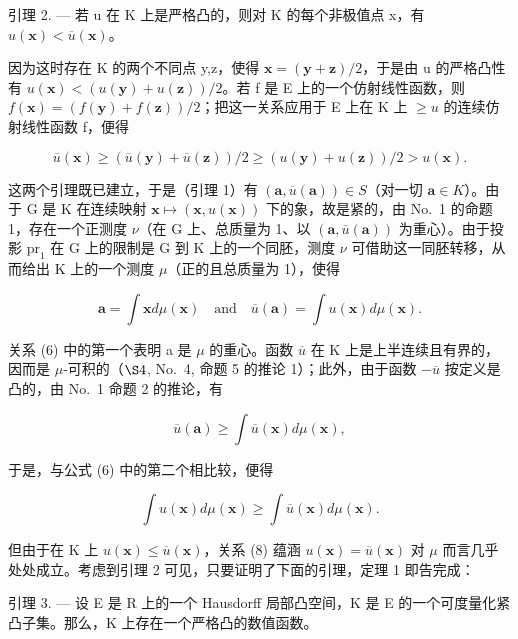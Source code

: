 引理 2. --- 若 u 在 K 上是严格凸的，则对 K 的每个非极值点 x，有 \(u(\mathbf{x}) < \overline{u}(\mathbf{x})\)。

因为这时存在 K 的两个不同点 y,z，使得 \(\mathbf{x} = (\mathbf{y} + \mathbf{z})/2\)，于是由 u 的严格凸性有 \(u(\mathbf{x}) < (u(\mathbf{y}) + u(\mathbf{z}))/2\)。若 f 是 E 上的一个仿射线性函数，则 \(f(\mathbf{x}) = (f(\mathbf{y}) + f(\mathbf{z}))/2\)；把这一关系应用于 E 上在 K 上 \(\geqslant u\) 的连续仿射线性函数 f，便得

\[
\overline {{{u}}} (\mathbf {x}) \geqslant \left(\overline {{{u}}} (\mathbf {y}) + \overline {{{u}}} (\mathbf {z})\right) / 2 \geqslant \left(u (\mathbf {y}) + u (\mathbf {z})\right) / 2 > u (\mathbf {x}).
\]

这两个引理既已建立，于是（引理 1）有 \((\mathbf{a},\overline{u} (\mathbf{a}))\in S\)（对一切 \(\mathbf{a}\in K\)）。由于 G 是 K 在连续映射 \(\mathbf{x}\mapsto (\mathbf{x},u(\mathbf{x}))\) 下的象，故是紧的，由 No.~1 的命题 1，存在一个正测度 \(\nu\)（在 G 上、总质量为 1、以 \((\mathbf{a},\overline{u} (\mathbf{a}))\) 为重心）。由于投影 \(\mathrm{pr}_1\) 在 G 上的限制是 G 到 K 上的一个同胚，测度 \(\nu\) 可借助这一同胚转移，从而给出 K 上的一个测度 \(\mu\)（正的且总质量为 1），使得

\[
\mathbf {a} = \int \mathbf {x} d \mu (\mathbf {x}) \quad \mathrm{and} \quad \overline {{{u}}} (\mathbf {a}) = \int u (\mathbf {x}) d \mu (\mathbf {x}).\tag{6}
\]

关系 (6) 中的第一个表明 a 是 \(\mu\) 的重心。函数 \(\overline{u}\) 在 K 上是上半连续且有界的，因而是 \(\mu\)-可积的（\(\S4\), No.~4, 命题 5 的推论 1）；此外，由于函数 \(-\overline{u}\) 按定义是凸的，由 No.~1 命题 2 的推论，有

\[
\overline {{{u}}} (\mathbf {a}) \geqslant \int \overline {{{u}}} (\mathbf {x}) d \mu (\mathbf {x}),\tag{7}
\]

于是，与公式 (6) 中的第二个相比较，便得

\[
\int u (\mathbf {x}) d \mu (\mathbf {x}) \geqslant \int \overline {{{u}}} (\mathbf {x}) d \mu (\mathbf {x}).\tag{8}
\]

但由于在 K 上 \(u(\mathbf{x}) \leqslant \overline{u}(\mathbf{x})\)，关系 (8) 蕴涵 \(u(\mathbf{x}) = \overline{u}(\mathbf{x})\) 对 \(\mu\) 而言几乎处处成立。考虑到引理 2 可见，只要证明了下面的引理，定理 1 即告完成：

引理 3. --- 设 E 是 R 上的一个 Hausdorff 局部凸空间，K 是 E 的一个可度量化紧凸子集。那么，K 上存在一个严格凸的数值函数。

